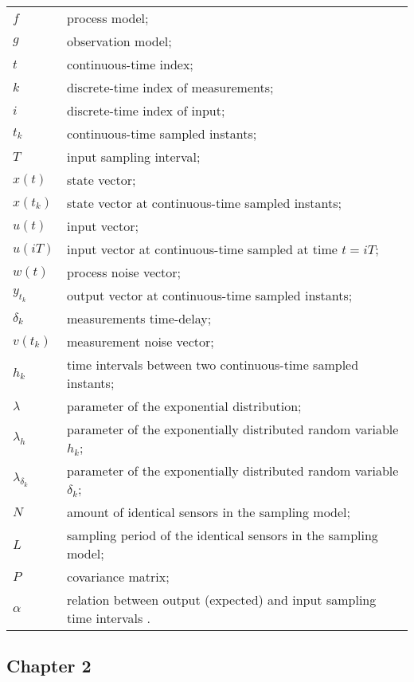 \begin{longtable}{ll}
	$f$						& process model; \\
	$g$						& observation model; \\
	$t$						& continuous-time index; \\
	$k$						& discrete-time index of measurements; \\
	$i$						& discrete-time index of input; \\
	$t_k$					& continuous-time sampled instants; \\
	$T$						& input sampling interval; \\
	$x(t)$					& state vector; \\
	$x(t_k)$				& state vector at continuous-time sampled instants; \\
	$u(t)$					& input vector; \\
	$u(iT)$					& input vector at continuous-time sampled at time $t = iT$; \\						
	$w(t)$					& process noise vector; \\
	$y_{t_k}$            	& output vector at continuous-time sampled instants;\\
	$\delta_{k}$			& measurements time-delay; \\
	$v(t_k)$				& measurement noise vector; \\
	$h_k$					& time intervals between two continuous-time sampled instants; \\
	$\lambda$ 				& parameter of the exponential distribution; \\
	$\lambda_h$				& parameter of the exponentially distributed random variable $h_k$; \\
	$\lambda_{\delta_{k}}$	& parameter of the exponentially distributed random variable $\delta_{k}$; \\
	$N$						& amount of identical sensors in the sampling model; \\
	$L$						& sampling period of the identical sensors in the sampling model; \\
	$P$						& covariance matrix; \\
	$\alpha$				& relation between output (expected) and input sampling time intervals . \\
\end{longtable}

\subsection*{Chapter 2}

